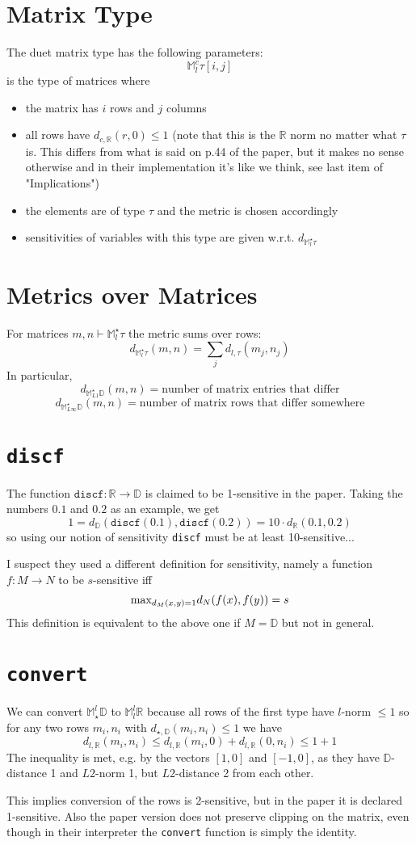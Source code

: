 \documentclass{article}
\begin{document}
\section*{Matrix Type}
The duet matrix type has the following parameters:
$$\mathbb{M}^c_l \tau[i,j]$$
is the type of matrices where
\begin{itemize}
   \item the matrix has $i$ rows and $j$ columns
   \item all rows have $d_{c,\mathbb{R}}(r,0) \leq 1$ (note that this is the $\mathbb{R}$ norm no matter what $\tau$ is. This differs from what is said on p.44 of the paper, but it makes no sense otherwise and in their implementation it's like we think, see last item of "Implications")
   \item the elements are of type $\tau$ and the metric is chosen accordingly
   \item sensitivities of variables with this type are given w.r.t. $d_{\mathbb{M}^\star_l\tau}$
\end{itemize}

\section*{Metrics over Matrices}
For matrices $m,n \vdash \mathbb{M}^\star_l\tau$ the metric sums over rows:
      $$d_{\mathbb{M}^\star_l\tau}(m,n) = \sum_j d_{l,\tau}(m_j,n_j)$$
In particular,
$$d_{\mathbb{M}^\star_{L1}\mathbb{D}}(m,n) = \text{number of matrix entries that differ}$$
$$d_{\mathbb{M}^\star_{L\infty}\mathbb{D}}(m,n) = \text{number of matrix rows that differ somewhere}$$

\section*{\texttt{discf}}
The function $\texttt{discf} : \mathbb{R}\rightarrow\mathbb{D}$ is claimed to be 1-sensitive in the paper. Taking the numbers $0.1$ and $0.2$ as an example, we get
\[1 = d_{\mathbb{D}}(\texttt{discf}(0.1),\texttt{discf}(0.2)) = 10 \cdot d_{\mathbb{R}}(0.1,0.2)\]
so using our notion of sensitivity \texttt{discf} must be at least 10-sensitive...

I suspect they used a different definition for sensitivity, namely a function $f:M\rightarrow N$ to be $s$-sensitive iff
\[\textnormal{max}_{d_M(x,y)=1} d_N(f(x),f(y)) = s\]
This definition is equivalent to the above one if $M = \mathbb{D}$ but not in general.

\section*{\texttt{convert}}
We can convert $\mathbb{M}^l_\star\mathbb{D}$ to $ \mathbb{M}^l_l\mathbb{R}$ because all rows of the first type have $l$-norm $\leq 1$ so for any two rows $m_i,n_i$ with $d_{\star,\mathbb{D}}(m_i,n_i) \leq 1$ we have 
      $$d_{l,\mathbb{R}}(m_i,n_i) \leq d_{l,\mathbb{R}}(m_i,0) + d_{l,\mathbb{R}}(0,n_i) \leq 1 + 1$$
The inequality is met, e.g. by the vectors $[1,0]$ and $[-1,0]$, as they have $\mathbb{D}$-distance 1 and $L2$-norm 1, but $L2$-distance 2 from each other.

This implies conversion of the rows is 2-sensitive, but in the paper it is declared 1-sensitive. Also the paper version does not preserve clipping on the matrix, even though in their interpreter the \texttt{convert} function is simply the identity.
\end{document}
